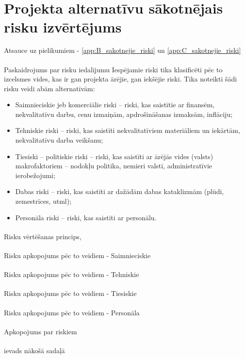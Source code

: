 \section{Projekta alternatīvu sākotnējais risku izvērtējums}
Atsauce uz pielikumiem - \ref{app:B_sakotnejie_riski} un \ref{app:C_sakotnejie_riski}
\paragraph{}
Paskaidrojums par risku iedalījumu
Iespējamie riski tika klasificēti pēc to izcelsmes vides, kas ir gan projekta ārējie, gan
iekšējie riski. Tika noteikti šādi risku veidi abām alternatīvām:
\begin{itemize}
    \item Saimnieciskie jeb komerciālie riski – riski, kas saistītie ar finansēm, nekvalitatīvu darbu,
cenu izmaiņām, apdrošināšanas izmaksām, inflāciju;
    \item Tehniskie riski – riski, kas saistīti nekvalitatīviem materiāliem un iekārtām, nekvalitatīvu
darba veikšanu;
    \item Tiesiski – politiskie riski – riski, kas saistīti ar ārējās vides (valsts) makrofaktoriem –
nodokļu politika, nemieri valstī, administratīvie ierobežojumi;
    \item Dabas riski – riski, kas saistīti ar dažādām dabas kataklizmām (plūdi, zemestrīces, utml);
    \item Personāla riski – riski, kas saistīti ar personālu.
\end{itemize}
\paragraph{}
Risku vērtēšanas princips,
\paragraph{}
Risku apkopojums pēc to veidiem - Saimnieciskie
\paragraph{}
Risku apkopojums pēc to veidiem - Tehniskie
\paragraph{}
Risku apkopojums pēc to veidiem - Tiesiskie
\paragraph{}
Risku apkopojums pēc to veidiem - Personāla
\paragraph{}
Apkopojums par riskiem
\paragraph{}
ievads nākošā sadaļā


